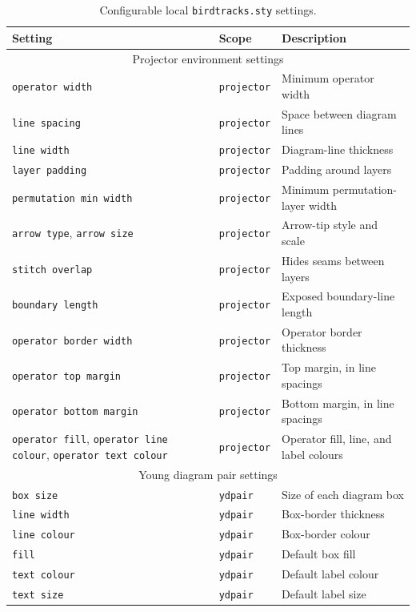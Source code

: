 \documentclass{article}
\begin{document}
\begin{table}[!h!]
    \centering
    \caption{Configurable local \texttt{birdtracks.sty} settings.}
    \small
    \begin{tabular}{@{}p{.28\linewidth}p{.18\linewidth}p{.46\linewidth}@{}}
\hline
Setting & Scope & Description \\
\hline
\multicolumn{3}{c}{Projector environment settings}\\
\hline
\texttt{operator width} & \texttt{projector} & Minimum operator width \\
\texttt{line spacing} & \texttt{projector} & Space between diagram lines \\
\texttt{line width} & \texttt{projector} & Diagram-line thickness \\
\texttt{layer padding} & \texttt{projector} & Padding around layers \\
\texttt{permutation min width} & \texttt{projector} & Minimum permutation-layer width \\
\texttt{arrow type}, \texttt{arrow size} & \texttt{projector} & Arrow-tip style and scale \\
\texttt{stitch overlap} & \texttt{projector} & Hides seams between layers \\
\texttt{boundary length} & \texttt{projector} & Exposed boundary-line length \\
\texttt{operator border width} & \texttt{projector} & Operator border thickness \\
\texttt{operator top margin} & \texttt{projector} & Top margin, in line spacings \\
\texttt{operator bottom margin} & \texttt{projector} & Bottom margin, in line spacings \\
\texttt{operator fill}, \texttt{operator line colour}, \texttt{operator text colour} & \texttt{projector} & Operator fill, line, and label colours \\
\hline
\multicolumn{3}{c}{Young diagram pair settings}\\
\hline
\texttt{box size} & \texttt{ydpair} & Size of each diagram box \\
\texttt{line width} & \texttt{ydpair} & Box-border thickness \\
\texttt{line colour} & \texttt{ydpair} & Box-border colour \\
\texttt{fill} & \texttt{ydpair} & Default box fill \\
\texttt{text colour} & \texttt{ydpair} & Default label colour \\
\texttt{text size} & \texttt{ydpair} & Default label size \\

\end{tabular}
\end{table}
\end{document}
